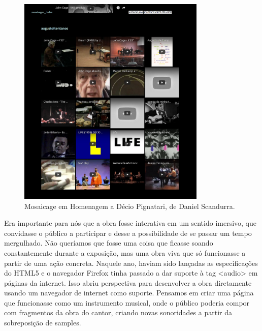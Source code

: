 \begin{figure}

\includegraphics[width=0.8\textwidth]{pictures/cap1/mosaicages}
\caption{Mosaicage em Homenagem a Décio Pignatari, de Daniel Scandurra.}
\label{fig:hp}
\end{figure}

Era importante para nós que a obra fosse interativa em um sentido imersivo, que convidasse o público a participar e desse a possibilidade de se passar um tempo mergulhado. Não queríamos que fosse uma coisa que ficasse soando constantemente durante a exposição, mas uma obra viva que só funcionasse a partir de uma ação concreta. Naquele ano, haviam sido lançadas as especificações do HTML5 e o navegador Firefox tinha passado a dar suporte à tag <audio> em páginas da internet. Isso abriu perspectiva para desenvolver a obra diretamente usando um navegador de internet como suporte. Pensamos em criar uma página que funcionasse como um instrumento musical, onde o público poderia compor com fragmentos da obra do cantor, criando novas sonoridades a partir da sobreposição de samples. 

